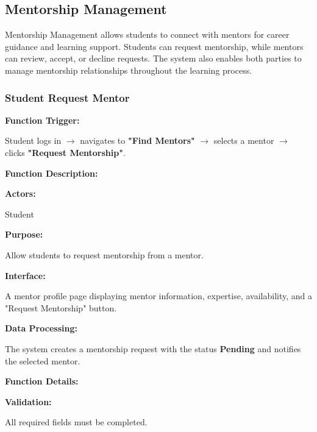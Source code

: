 \subsection{Mentorship Management}

Mentorship Management allows students to connect with mentors for career guidance and learning support. Students can request mentorship, while mentors can review, accept, or decline requests. The system also enables both parties to manage mentorship relationships throughout the learning process.

\subsubsection{Student Request Mentor}

\textbf{Function Trigger:}

Student logs in $\rightarrow$ navigates to \textbf{"Find Mentors"} $\rightarrow$ selects a mentor $\rightarrow$ clicks \textbf{"Request Mentorship"}.

\vspace{0.3cm}

\textbf{Function Description:}

\textbf{Actors:}

Student

\vspace{0.2cm}

\textbf{Purpose:}

Allow students to request mentorship from a mentor.

\vspace{0.2cm}

\textbf{Interface:}

A mentor profile page displaying mentor information, expertise, availability, and a "Request Mentorship" button.

\vspace{0.2cm}

\textbf{Data Processing:}

The system creates a mentorship request with the status \textbf{Pending} and notifies the selected mentor.

\vspace{0.3cm}

\textbf{Function Details:}

\textbf{Validation:}

All required fields must be completed.

